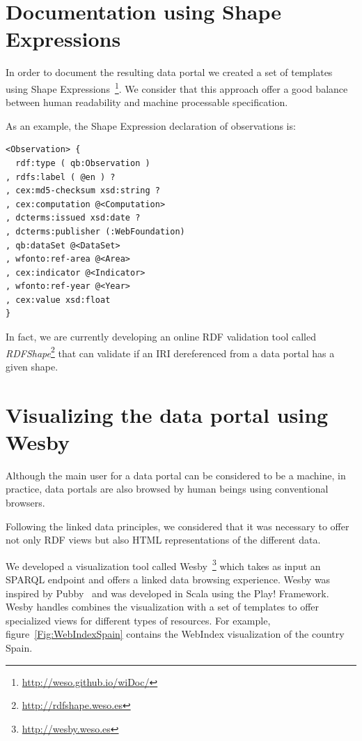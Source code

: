 \documentclass{llncs}
\begin{document}
\section{Documentation using Shape Expressions}

In order to document the resulting data portal we created a set of templates using Shape Expressions~\footnote{\url{http://weso.github.io/wiDoc/}}. We consider that this approach offer a good balance between human readability and machine processable specification. 

As an example, the Shape Expression declaration of observations is:

\begin{lstlisting}[style=SPARQL]
<Observation> { 
  rdf:type ( qb:Observation )  
, rdfs:label ( @en ) ?
, cex:md5-checksum xsd:string ?
, cex:computation @<Computation> 
, dcterms:issued xsd:date ?
, dcterms:publisher (:WebFoundation) 
, qb:dataSet @<DataSet>
, wfonto:ref-area @<Area>
, cex:indicator @<Indicator> 
, wfonto:ref-year @<Year>
, cex:value xsd:float              
}
\end{lstlisting}

In fact, we are currently developing an online RDF validation tool called \emph{RDFShape}\footnote{\url{http://rdfshape.weso.es}} that can validate if an IRI dereferenced from a data portal has a given shape.

\section{Visualizing the data portal using Wesby}

Although the main user for a data portal can be considered to be a machine, in practice, data portals are also browsed by human beings using conventional browsers. 

Following the linked data principles, we considered that it was necessary to offer not only RDF views but also HTML representations of the different data.

We developed a visualization tool called Wesby~\footnote{\url{http://wesby.weso.es}} which takes as input an SPARQL endpoint and offers a linked data browsing experience. Wesby was inspired by Pubby~\cite{Pubby} and was developed in Scala using the Play! Framework. 
Wesby handles combines the visualization with a set of templates to offer specialized views for different
 types of resources. For example, figure~\ref{Fig:WebIndexSpain} contains the WebIndex visualization of 
 the country Spain.
\end{document}
